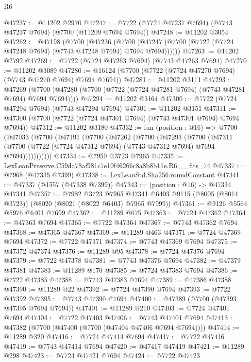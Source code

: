 \begin{lexlean}{R6}
\begin{coremodule}
@47237 := @11202 @2970
@47247 := @7722 (@7724 @47237 @7694) (@7743 @47237 @7694) (@7700 (@11209 @7694 @7694))
@47248 := @11202 @3054
@47262 := @47198
    (@7700
      (@47236
        (@7700 (@47247 (@7700 (@7722 (@7724 @47248 @7694) (@7743 @47248 @7694) @7694 @7694))))))
@47263 := @11202 @2792
@47269 := @7722 (@7724 @47263 @7694) (@7743 @47263 @7694)
@47270 := @11202 @3089
@47280 := @16124 (@7700 (@7722 (@7724 @47270 @7694) (@7743 @47270 @7694) @7694 @7694))
@47281 := @11202 @3111
@47293 := @47269
    (@7700 (@47280 (@7700 (@7722 (@7724 @47281 @7694) (@7743 @47281 @7694) @7694 @7694))))
@47294 := @11202 @3164
@47300 := @7722 (@7724 @47294 @7694) (@7743 @47294 @7694)
@47301 := @11202 @3151
@47311 := @47300 (@7700 (@7722 (@7724 @47301 @7694) (@7743 @47301 @7694) @7694 @7694))
@47312 := @11202 @3180
@47332 := fun (position : @16) =>
  @7700
    (@47033
      (@7700
        (@47191
          (@7700
            (@47262
              (@7700
                (@47293
                  (@7700
                    (@47311
                      (@7700 (@7722 (@7724 @47312 @7694) (@7743 @47312 @7694) @7694 @7694)))))))))))
@47334 := @7959 @3723 @7965
@47335 := LexLeanPreserve.C59da78af981c7e10f46266c8a8b8b11e.R6.__fits_74
@47337 := @7968 (@47335 @7399)
@47338 := LexLeanStd.Sha256.roundConstant
@47341 := @47337 (@1557 (@47338 @7399))
@47343 := (position : @16) -> @47334 @47341
@47357 := @7982
    @3723
    @7965
    @47341
    @6403
    @9115
    (@8005 (@8014 @3723))
    (@8020 (@8021 (@8022 @6403) @7965 @7999))
@47361 := @9126 @5564 @5976 @6401 @7699
@47362 := @11289 @675
@47363 := @7724 @47362
@47364 := @47363 @7694
@47365 := @7722 @47364
@47367 := @7743 @47362 @7694
@47368 := @47365 @47367
@47369 := @11289 @463
@47371 := @7724 @47369 @7694
@47372 := @7722 @47371
@47374 := @7743 @47369 @7694
@47375 := @47372 @47374
@47376 := @11289 @95
@47378 := @7724 @47376 @7694
@47379 := @7722 @47378
@47381 := @7743 @47376 @7694
@47382 := @47379 @47381
@47383 := @11289 @170
@47385 := @7724 @47383 @7694
@47386 := @7722 @47385
@47388 := @7743 @47383 @7694
@47389 := @47386 @47388
@47390 := @11289 @22
@47392 := @7724 @47390 @7694
@47393 := @7722 @47392
@47395 := @7743 @47390 @7694
@47400 := @47389 (@7700 (@47393 @47395 @7694 @7694))
@47401 := @11289 @210
@47403 := @7724 @47401 @7694
@47404 := @7722 @47403
@47406 := @7743 @47401 @7694
@47413 := @47382 (@7700 (@47400 (@7700 (@47404 @47406 @7694 @7694))))
@47414 := @11289 @320
@47416 := @7724 @47414 @7694
@47417 := @7722 @47416
@47419 := @7743 @47414 @7694
@47420 := @47417 @47419
@47421 := @11289 @298
@47423 := @7724 @47421 @7694
@47424 := @7722 @47423

\end{coremodule}
\end{lexlean}
